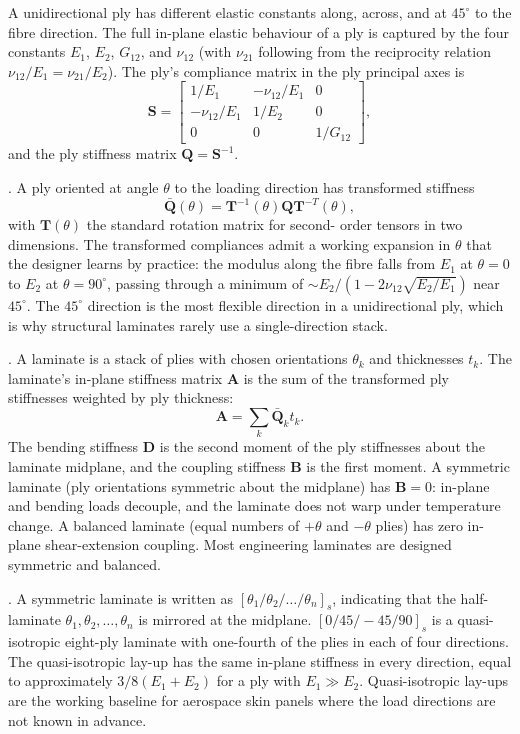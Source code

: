 A unidirectional ply has different elastic constants along, across,
and at $45^\circ$ to the fibre direction. The full in-plane elastic
behaviour of a ply is captured by the four constants $E_1$, $E_2$,
$G_{12}$, and $\nu_{12}$ (with $\nu_{21}$ following from the
reciprocity relation $\nu_{12}/E_1 = \nu_{21}/E_2$). The ply's
compliance matrix in the ply principal axes is
\[
\mathbf{S} = \begin{bmatrix}
1/E_1 & -\nu_{12}/E_1 & 0 \\
-\nu_{12}/E_1 & 1/E_2 & 0 \\
0 & 0 & 1/G_{12}
\end{bmatrix},
\]
and the ply stiffness matrix $\mathbf{Q} = \mathbf{S}^{-1}$.

. A ply oriented at angle $\theta$ to the
loading direction has transformed stiffness
\[
\bar{\mathbf{Q}}(\theta) = \mathbf{T}^{-1}(\theta) \mathbf{Q}
\mathbf{T}^{-T}(\theta),
\]
with $\mathbf{T}(\theta)$ the standard rotation matrix for second-
order tensors in two dimensions. The transformed compliances admit a
working expansion in $\theta$ that the designer learns by
practice: the modulus along the fibre falls from $E_1$ at $\theta = 0$
to $E_2$ at $\theta = 90^\circ$, passing through a minimum of
$\sim E_2 / (1 - 2 \nu_{12} \sqrt{E_2/E_1})$ near $45^\circ$. The
$45^\circ$ direction is the most flexible direction in a unidirectional
ply, which is why structural laminates rarely use a single-direction
stack.

. A laminate is a stack of plies
with chosen orientations $\theta_k$ and thicknesses $t_k$. The
laminate's in-plane stiffness matrix $\mathbf{A}$ is the sum of the
transformed ply stiffnesses weighted by ply thickness:
\[
\mathbf{A} = \sum_k \bar{\mathbf{Q}}_k t_k.
\]
The bending stiffness $\mathbf{D}$ is the second moment of the ply
stiffnesses about the laminate midplane, and the coupling stiffness
$\mathbf{B}$ is the first moment. A symmetric laminate (ply
orientations symmetric about the midplane) has $\mathbf{B} = 0$:
in-plane and bending loads decouple, and the laminate does not warp
under temperature change. A balanced laminate (equal numbers of
$+\theta$ and $-\theta$ plies) has zero in-plane shear-extension
coupling. Most engineering laminates are designed symmetric and
balanced.

. A symmetric laminate is written as
$[\theta_1/\theta_2/\dots/\theta_n]_s$, indicating that the
half-laminate $\theta_1, \theta_2, \dots, \theta_n$ is mirrored at the
midplane. $[0/45/-45/90]_s$ is a quasi-isotropic eight-ply laminate
with one-fourth of the plies in each of four directions. The
quasi-isotropic lay-up has the same in-plane stiffness in every
direction, equal to approximately $3/8 (E_1 + E_2)$ for a ply with
$E_1 \gg E_2$. Quasi-isotropic lay-ups are the working baseline for
aerospace skin panels where the load directions are not known in
advance.

